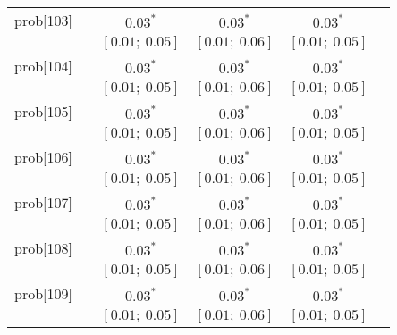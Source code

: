 \begin{table}
\begin{center}
\begin{tabular}{l c c c c c }
prob[103]   &                                  & $0.03^{*}$                & $0.03^{*}$                & $0.03^{*}$              &                         \\
            &                                  & $[0.01;\ 0.05]$           & $[0.01;\ 0.06]$           & $[0.01;\ 0.05]$         &                         \\
prob[104]   &                                  & $0.03^{*}$                & $0.03^{*}$                & $0.03^{*}$              &                         \\
            &                                  & $[0.01;\ 0.05]$           & $[0.01;\ 0.06]$           & $[0.01;\ 0.05]$         &                         \\
prob[105]   &                                  & $0.03^{*}$                & $0.03^{*}$                & $0.03^{*}$              &                         \\
            &                                  & $[0.01;\ 0.05]$           & $[0.01;\ 0.06]$           & $[0.01;\ 0.05]$         &                         \\
prob[106]   &                                  & $0.03^{*}$                & $0.03^{*}$                & $0.03^{*}$              &                         \\
            &                                  & $[0.01;\ 0.05]$           & $[0.01;\ 0.06]$           & $[0.01;\ 0.05]$         &                         \\
prob[107]   &                                  & $0.03^{*}$                & $0.03^{*}$                & $0.03^{*}$              &                         \\
            &                                  & $[0.01;\ 0.05]$           & $[0.01;\ 0.06]$           & $[0.01;\ 0.05]$         &                         \\
prob[108]   &                                  & $0.03^{*}$                & $0.03^{*}$                & $0.03^{*}$              &                         \\
            &                                  & $[0.01;\ 0.05]$           & $[0.01;\ 0.06]$           & $[0.01;\ 0.05]$         &                         \\
prob[109]   &                                  & $0.03^{*}$                & $0.03^{*}$                & $0.03^{*}$              &                         \\
            &                                  & $[0.01;\ 0.05]$           & $[0.01;\ 0.06]$           & $[0.01;\ 0.05]$         &                         \\

\end{tabular}
\end{center}
\end{table}
